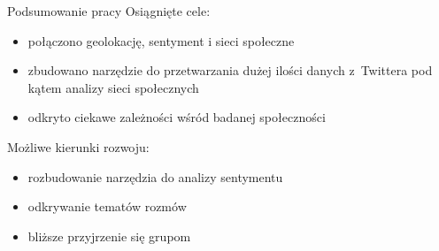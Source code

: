 \documentclass{beamer}
\begin{document}
\appendix
\begin{frame}{Podsumowanie pracy}
Osiągnięte cele:
\begin{itemize}
\item połączono geolokację, sentyment i sieci społeczne
\item zbudowano narzędzie do przetwarzania dużej ilości danych z~Twittera pod
kątem analizy sieci społecznych
\item odkryto ciekawe zależności wśród badanej społeczności
\end{itemize}
\vspace{0.5cm}
Możliwe kierunki rozwoju:
\begin{itemize}
\item rozbudowanie narzędzia do analizy sentymentu
\item odkrywanie tematów rozmów
\item bliższe przyjrzenie się grupom
\end{itemize} 
 
\end{frame} 
 
\end{document}
